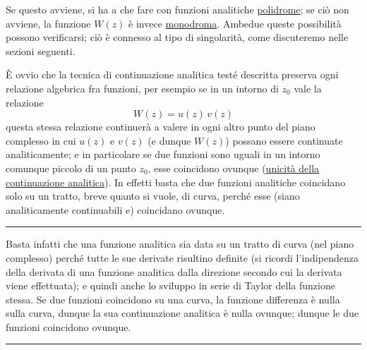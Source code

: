\documentclass[11pt, a4paper]{book}
\numberwithin{equation}{section}
\begin{document}
Se questo avviene, si ha a che fare con funzioni analitiche \underline{polidrome}; se ciò non avviene, la funzione $W(z)$ è invece \underline{monodroma}. Ambedue queste possibilità possono verificarsi; ciò è connesso al tipo di singolarità, come discuteremo nelle sezioni seguenti.

È ovvio che la tecnica di continuazione analitica testé descritta preserva ogni relazione algebrica fra funzioni, per esempio se in un intorno di $z_0$ vale la relazione
\begin{equation}
W(z) = u(z)\, v(z) \tag{11}
\end{equation}
questa stessa relazione continuerà a valere in ogni altro punto del piano complesso in cui $u(z)$ e $v(z)$ (e dunque $W(z)$) possano essere continuate analiticamente; e in particolare se due funzioni sono uguali in un intorno comunque piccolo di un punto $z_0$, esse coincidono ovunque (\underline{unicità della continuazione analitica}). In effetti basta che due funzioni analitiche coincidano solo su un tratto, breve quanto si vuole, di curva, perché esse (siano analiticamente continuabili e) coincidano ovunque.

\medskip\hrule\medskip

Basta infatti che una funzione analitica sia data su un tratto di curva (nel piano complesso) perché tutte le sue derivate risultino definite (si ricordi l'indipendenza della derivata di una funzione analitica dalla direzione secondo cui la derivata viene effettuata); e quindi anche lo sviluppo in serie di Taylor della funzione stessa. Se due funzioni coincidono su una curva, la funzione differenza è nulla sulla curva, dunque la sua continuazione analitica è nulla ovunque; dunque le due funzioni coincidono ovunque.

\medskip\hrule\medskip
\end{document}
